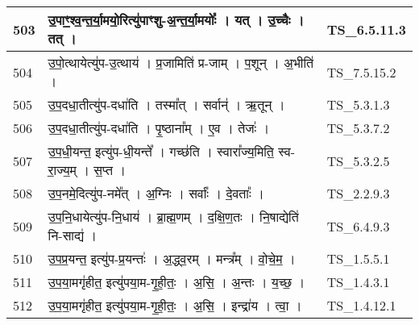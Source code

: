 \documentclass[17pt]{extarticle}
\begin{document}
\begin{longtable}{||p{0.4in}||p{4.9in}||p{0.9in}||}
    503 & उ॒पाꣳ॒॒श्व॒न्त॒र्या॒मयो॒रित्यु॑पाꣳशु{-}अ॒न्त॒र्या॒मयोः᳚   ।   यत्   ।   उ॒च्चैः   ।   तत्   ।    & TS\_6.5.11.3       \\
    
    \hline
        
    504 & उ॒पो॒त्थायेत्यु॑प{-}उ॒त्थाय॑   ।   प्र॒जामिति॑ प्र{-}जाम्   ।   प॒शून्   ।   अ॒भीति॑   ।    & TS\_7.5.15.2       \\
    
    \hline
        
    505 & उ॒प॒दधा॒तीत्यु॑प{-}दधा॑ति   ।   तस्मा᳚त्   ।   सर्वान्॑   ।   ऋ॒तून्   ।    & TS\_5.3.1.3       \\
    
    \hline
        
    506 & उ॒प॒दधा॒तीत्यु॑प{-}दधा॑ति   ।   पृ॒ष्ठाना᳚म्   ।   ए॒व   ।   तेजः॑   ।    & TS\_5.3.7.2       \\
    
    \hline
        
    507 & उ॒प॒धी॒यन्त॒ इत्यु॑प{-}धी॒यन्ते᳚   ।   गच्छ॑ति   ।   स्वारा᳚ज्य॒मिति॒ स्व{-}रा॒ज्य॒म्   ।   स॒प्त   ।    & TS\_5.3.2.5       \\
    
    \hline
        
    508 & उ॒प॒नमे॒दित्यु॑प{-}नमे᳚त्   ।   अ॒ग्निः   ।   सर्वाः᳚   ।   दे॒वताः᳚   ।    & TS\_2.2.9.3       \\
    
    \hline
        
    509 & उ॒प॒नि॒धायेत्यु॑प{-}नि॒धाय॑   ।   ब्रा॒ह्म॒णम्   ।   द॒क्षि॒ण॒तः   ।   नि॒षाद्येति॑ नि{-}साद्य॑   ।    & TS\_6.4.9.3       \\
    
    \hline
        
    510 & उ॒प॒प्र॒यन्त॒ इत्यु॑प{-}प्र॒यन्तः॑   ।   अ॒द्ध्व॒रम्   ।   मन्त्र᳚म्   ।   वो॒चे॒म॒   ।    & TS\_1.5.5.1       \\
    
    \hline
        
    511 & उ॒प॒या॒मगृ॑हीत॒ इत्यु॑पया॒म{-}गृ॒ही॒तः॒   ।   अ॒सि॒   ।   अ॒न्तः   ।   य॒च्छ॒   ।    & TS\_1.4.3.1       \\
    
    \hline
        
    512 & उ॒प॒या॒मगृ॑हीत॒ इत्यु॑पया॒म{-}गृ॒ही॒तः॒   ।   अ॒सि॒   ।   इन्द्रा॑य   ।   त्वा॒   ।    & TS\_1.4.12.1       \\
    

\end{longtable}
\end{document}
